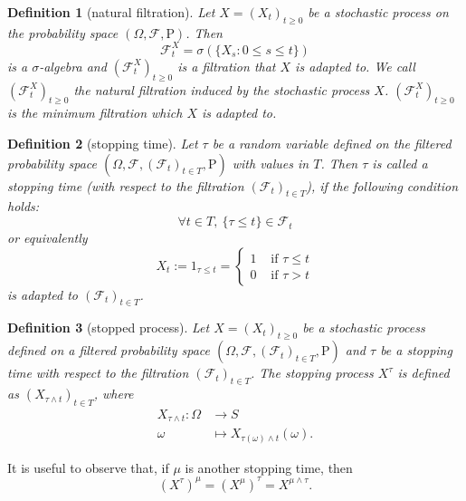 \documentclass{article}
\newtheorem{definition}{Definition}[section]
\theoremstyle{nonumberplain}
\begin{document}
\begin{definition}[natural filtration]
	Let $X=(X_{t})_{t\ge 0}$ be a stochastic process on the probability space $(\Omega,\mathcal{F},\mathrm{P})$. Then 
	\[
	{\mathcal {F}}_{t}^X=\sigma (\{X_{s}:0\le s\le t\})
	\]
	is a $\sigma$-algebra and $(\mathcal {F}_{t}^X)_{t\ge0} $ is a filtration that $X$ is adapted to. We call $(\mathcal {F}_{t}^X)_{t\ge0} $ the \emph{natural filtration} induced by the stochastic process $X$. $(\mathcal {F}_{t}^X)_{t\ge0} $ is the minimum filtration which $X$ is adapted to.
\end{definition}

\begin{definition}[stopping time]
Let $\tau$  be a random variable defined on the filtered probability space $(\Omega,\mathcal{F},(\mathcal{F}_{t})_{t\in T },\mathrm{P})$ with values in $T$. Then $\tau$  is called a \emph{stopping time} (with respect to the filtration $(\mathcal{F}_{t})_{t\in T}$), if the following condition holds:
\[
\forall t\in T,\ \{\tau \leq t\}\in {\mathcal {F}}_{t}
\]
or equivalently
\[
X_{t} :=1_{\tau\le t}=\left\{\begin{array}{ll}{1} & {\text { if }  \tau\le t } \\ {0} & {\text { if }\tau >t}\end{array}\right.
\]
is adapted to $(\mathcal{F}_{t})_{t\in T }$.
\end{definition}



\begin{definition}[stopped process]
	Let $X=(X_{t})_{t\ge 0}$ be a stochastic process defined on a filtered probability space $(\Omega,\mathcal{F},(\mathcal{F}_{t})_{t\in T},\mathrm{P})$ and $\tau$ be a stopping time with respect to the filtration $(\mathcal{F}_{t})_{t\in T}$. The stopping process $X^\tau$ is defined as $(X_{\tau \wedge t})_{t\in T}$, where
	\begin{align*}
	X_{\tau \wedge t}:\Omega&\longrightarrow S\\
	\omega&\longmapsto X_{\tau(\omega) \wedge t}(\omega).
	\end{align*}
\end{definition}

It is useful to observe that, if $\mu$ is another stopping time, then
\[
(X^\tau)^\mu=(X^\mu)^\tau=X^{\mu\wedge\tau}.
\]
\end{document}
